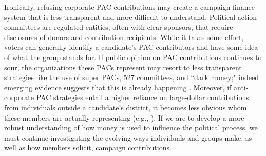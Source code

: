 \documentclass[12pt]{article}
\begin{document}
Ironically, refusing corporate PAC contributions may create a campaign finance system that is less transparent and more difficult to understand. Political action committees are regulated entities, often with clear sponsors, that require disclosures of donors and contribution recipients. While it takes some effort, voters can generally identify a candidate's PAC contributors and have some idea of what the group stands for. If public opinion on PAC contributions continues to sour, the organizations these PACs represent may resort to less transparent strategies like the use of super PACs, 527 committees, and ``dark money;" indeed emerging evidence suggests that this is already happening \citep{opensecrets.org2019, massoglia2021}. Moreover, if anti-corporate PAC strategies entail a higher reliance on large-dollar contributions from individuals outside a candidate's district, it becomes less obvious whom these members are actually representing (e.g., \cite{baker2016}). If we are to develop a more robust understanding of how money is used to influence the political process, we must continue investigating the evolving ways individuals and groups make, as well as how members solicit, campaign contributions. 

\singlespacing
{}
%
\printbibliography
\pagebreak
\end{document}
